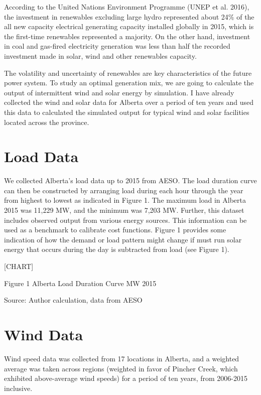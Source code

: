 



\label{data-and-work-completed-to-date}

According to the United Nations Environment Programme (UNEP et al.
2016), the investment in renewables excluding large hydro represented
about 24\% of the all new capacity electrical generating capacity
installed globally in 2015, which is the first-time renewables
represented a majority. On the other hand, investment in coal and
gas-fired electricity generation was less than half the recorded
investment made in solar, wind and other renewables capacity.

The volatility and uncertainty of renewables are key characteristics of
the future power system. To study an optimal generation mix, we are
going to calculate the output of intermittent wind and solar energy by
simulation. I have already collected the wind and solar data for Alberta
over a period of ten years and used this data to calculated the
simulated output for typical wind and solar facilities located across
the province.

\section{Load Data}\label{load-data}

We collected Alberta's load data up to 2015 from AESO. The load duration
curve can then be constructed by arranging load during each hour through
the year from highest to lowest as indicated in Figure 1. The maximum
load in Alberta 2015 was 11,229 MW, and the minimum was 7,203 MW.
Further, this dataset includes observed output from various energy
sources. This information can be used as a benchmark to calibrate cost
functions. Figure 1 provides some indication of how the demand or load
pattern might change if must run solar energy that occurs during the day
is subtracted from load (see Figure 1).

{{[}CHART{]}}

Figure 1 Alberta Load Duration Curve MW 2015

Source: Author calculation, data from AESO

\section{Wind Data}\label{wind-data}

Wind speed data was collected from 17 locations in Alberta, and a
weighted average was taken across regions (weighted in favor of Pincher
Creek, which exhibited above-average wind speeds) for a period of ten
years, from 2006-2015 inclusive.

